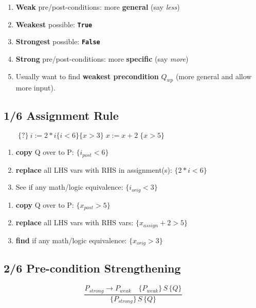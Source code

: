 {\footnotesize
\begin{enumerate}
\item \textbf{Weak} pre/post-conditions: more \textbf{general} (say \emph{less})
\item \textbf{Weakest} possible: \textbf{\texttt{True}}
\item \textbf{Strongest} possible: \textbf{\texttt{False}}
\item \textbf{Strong} pre/post-conditions: more \textbf{specific} (say \emph{more})
\item Usually want to find \textbf{weakest precondition} $Q_{wp}$ (more general and allow more input).
\end{enumerate}
\subsection*{1/6 Assignment Rule}
\(\qquad\{?\}\ i := 2 * i \{i < 6\}\)\hfill\(\{x > 3\}\;x:=x+2\;\{x>5\}\)\\
\begin{minipage}{0.45\linewidth}
\begin{enumerate}
\item \textbf{copy} Q over to P: \(\{i_{post} < 6\}\)
\item \textbf{replace} all LHS vars with RHS in assignment(s): \(\{2 * i < 6\}\)
\item See if any math/logic equivalence: \(\{i_{orig} < 3\}\)
\end{enumerate}
\end{minipage}
\begin{minipage}{0.45\linewidth}
\begin{enumerate}
\item \textbf{copy} Q over to P: \(\{x_{post} > 5\}\)
\item \textbf{replace} all LHS vars with RHS vars: \(\{x_{assign}+2 > 5\}\)
\item \textbf{find} if any math/logic equivalence: \(\{x_{orig} > 3\}\)
\end{enumerate}
\end{minipage}

\subsection*{2/6 Pre-condition Strengthening}
\begin{displaymath}
  \frac{P_{strong} \rightarrow P_{weak} \quad \{P_{weak}\}\,S\,\{Q\} } {\{P_{strong}\}\,S\,\{Q\}}
\end{displaymath}

}
